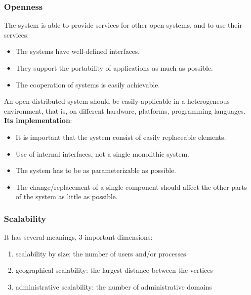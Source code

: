 \documentclass[margin=0px]{article}
\begin{document}
\subsubsection{Openness}

The system is able to provide services for other open systems, and to use their services:

\begin{itemize}
    \item	The systems have well-defined interfaces.
    \item	They support the portability of applications as much as possible.
    \item	The cooperation of systems is easily achievable.
\end{itemize}

\noindent An open distributed system should be easily applicable in a heterogeneous environment, that is,
on different hardware, platforms, programming languages.\\

\noindent \textbf{Its implementation}:

\begin{itemize}
    \item	It is important that the system consist of easily replaceable elements.
    \item	Use of internal interfaces, not a single monolithic system.
    \item	The system has to be as parameterizable as possible.
    \item	The change/replacement of a single component should affect the other parts of the system as little as possible.
\end{itemize}

\subsubsection{Scalability}

It has several meanings, 3 important dimensions:

\begin{enumerate}
    \item	scalability by size: the number of users and/or processes
    \item	geographical scalability: the largest distance between the vertices
    \item	administrative scalability: the number of administrative domains
\end{enumerate}
\end{document}

